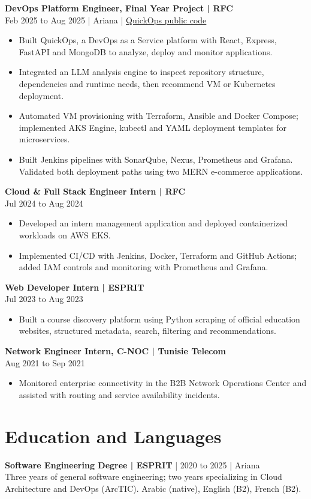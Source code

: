 \documentclass[11pt,a4paper]{article}
\newcommand{\role}[3]{\Needspace{5\baselineskip}\textbf{#1 | #2}\\#3\par}
\begin{document}
\role{DevOps Platform Engineer, Final Year Project}{RFC}{Feb 2025 to Aug 2025 | Ariana | \href{https://github.com/tamim-hmizi/QuickOps-AI}{QuickOps public code}}
\begin{itemize}
\item Built QuickOps, a DevOps as a Service platform with React, Express, FastAPI and MongoDB to analyze, deploy and monitor applications.
\item Integrated an LLM analysis engine to inspect repository structure, dependencies and runtime needs, then recommend VM or Kubernetes deployment.
\item Automated VM provisioning with Terraform, Ansible and Docker Compose; implemented AKS Engine, kubectl and YAML deployment templates for microservices.
\item Built Jenkins pipelines with SonarQube, Nexus, Prometheus and Grafana. Validated both deployment paths using two MERN e-commerce applications.
\end{itemize}

\role{Cloud \& Full Stack Engineer Intern}{RFC}{Jul 2024 to Aug 2024}
\begin{itemize}
\item Developed an intern management application and deployed containerized workloads on AWS EKS.
\item Implemented CI/CD with Jenkins, Docker, Terraform and GitHub Actions; added IAM controls and monitoring with Prometheus and Grafana.
\end{itemize}

\role{Web Developer Intern}{ESPRIT}{Jul 2023 to Aug 2023}
\begin{itemize}
\item Built a course discovery platform using Python scraping of official education websites, structured metadata, search, filtering and recommendations.
\end{itemize}

\role{Network Engineer Intern, C-NOC}{Tunisie Telecom}{Aug 2021 to Sep 2021}
\begin{itemize}
\item Monitored enterprise connectivity in the B2B Network Operations Center and assisted with routing and service availability incidents.
\end{itemize}

\section{Education and Languages}
\textbf{Software Engineering Degree | ESPRIT} | 2020 to 2025 | Ariana\\
Three years of general software engineering; two years specializing in Cloud Architecture and DevOps (ArcTIC). Arabic (native), English (B2), French (B2).
\end{document}
